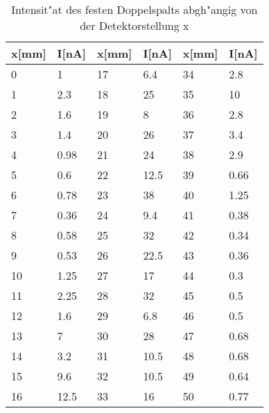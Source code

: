 \begin{table}[h]	
\centering
\begin{tabular}{|l l||l l||l l|} \hline
	x[mm] & I[nA] & x[mm] & I[nA] & x[mm] & I[nA]\\
	\hline
	0	&	1     &  17	&	6.4   & 34	&	2.8\\
	1	&	2.3   &  18	&	25    & 35	&	10\\
	2	&	1.6   &  19	&	8     & 36  &	2.8\\
	3	&	1.4   &  20	&	26    & 37  &	3.4\\
	4	&	0.98  &  21	&	24    & 38	&	2.9\\
	5	&	0.6   &  22	&	12.5  & 39	&	0.66\\
	6	&	0.78  &  23	&	38    & 40	&	1.25\\
	7	&	0.36  &  24	&	9.4   & 41	&	0.38\\
	8	&	0.58  &  25	&	32    & 42	&	0.34\\
	9	&	0.53  &  26	&	22.5  & 43	&	0.36\\
	10	&	1.25  &  27	&	17    & 44	&	0.3\\
	11	&	2.25  &  28	&	32    & 45	&	0.5\\
	12	&	1.6   &  29	&	6.8   & 46	&	0.5\\
	13	&	7     &  30	&	28    & 47	&	0.68\\
	14	&	3.2   &  31	&	10.5  & 48	&	0.68\\
	15	&	9.6   &  32	&	10.5  & 49	&	0.64\\
	16	&	12.5  &  33	&	16    & 50	&	0.77\\
	\hline
\end{tabular}
\caption{Intensit"at des festen Doppelspalts abgh"angig von der Detektorstellung x}
\label{tabelle_3}
\end{table}

